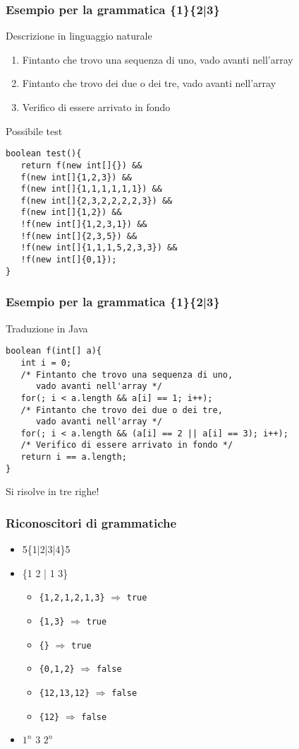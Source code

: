 \documentclass{beamer}
\begin{document}
\begin{frame}[fragile]
\frametitle{Esempio per la grammatica \{1\}\{2|3\}}
\begin{block}{Descrizione in linguaggio naturale}
\begin{enumerate}
 \item Fintanto che trovo una sequenza di uno, vado avanti nell'array
 \item Fintanto che trovo dei due o dei tre, vado avanti nell'array
 \item Verifico di essere arrivato in fondo
\end{enumerate}
\end{block}
\begin{block}{Possibile test}
\scriptsize
 \begin{verbatim}
boolean test(){
   return f(new int[]{}) && 
   f(new int[]{1,2,3}) && 
   f(new int[]{1,1,1,1,1,1}) && 
   f(new int[]{2,3,2,2,2,2,3}) && 
   f(new int[]{1,2}) && 
   !f(new int[]{1,2,3,1}) && 
   !f(new int[]{2,3,5}) && 
   !f(new int[]{1,1,1,5,2,3,3}) && 
   !f(new int[]{0,1});
}
 \end{verbatim}
 \normalsize
\end{block}
\end{frame}

\begin{frame}[fragile]
\frametitle{Esempio per la grammatica \{1\}\{2|3\}}
\begin{block}{Traduzione in Java}
 \begin{verbatim}
boolean f(int[] a){
   int i = 0;
   /* Fintanto che trovo una sequenza di uno,
      vado avanti nell'array */
   for(; i < a.length && a[i] == 1; i++);
   /* Fintanto che trovo dei due o dei tre,
      vado avanti nell'array */
   for(; i < a.length && (a[i] == 2 || a[i] == 3); i++);
   /* Verifico di essere arrivato in fondo */
   return i == a.length;
}
 \end{verbatim}
\end{block}
Si risolve in tre righe!
\end{frame}

\begin{frame}[fragile]
\frametitle{Riconoscitori di grammatiche}
\begin{itemize}
 \item 5\{1|2|3|4\}5
 \item \{1 2 | 1 3\}
  \begin{itemize}
  \item \texttt{\{1,2,1,2,1,3\}} $\Rightarrow$ \texttt{true}
  \item \texttt{\{1,3\}} $\Rightarrow$ \texttt{true}
  \item \texttt{\{\}} $\Rightarrow$ \texttt{true}
  \item \texttt{\{0,1,2\}} $\Rightarrow$ \texttt{false}
  \item \texttt{\{12,13,12\}} $\Rightarrow$ \texttt{false}
  \item \texttt{\{12\}} $\Rightarrow$ \texttt{false}
  \end{itemize}
 \item $1^n$ 3 $2^n$
\end{itemize}
\end{frame}
\end{document}
